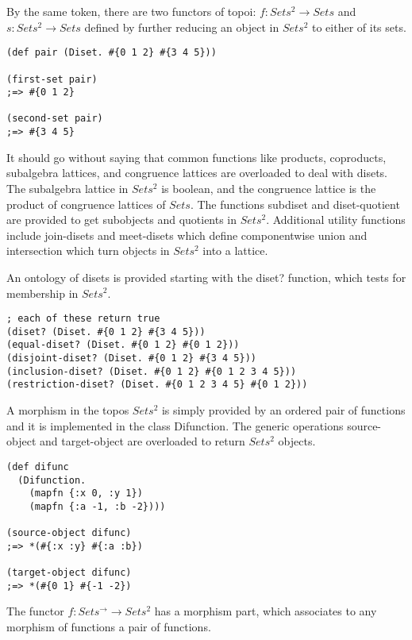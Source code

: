 \documentclass[a4paper,11pt]{report}
\begin{document}
By the same token, there are two functors of topoi: $f: Sets^2 \to Sets$ and $s: Sets^2 \to Sets$ defined by further reducing an object in $Sets^2$ to either of its sets.

\lstset {language=Lisp}
\begin{lstlisting}
(def pair (Diset. #{0 1 2} #{3 4 5}))

(first-set pair)
;=> #{0 1 2}

(second-set pair)
;=> #{3 4 5}
\end{lstlisting}

It should go without saying that common functions like products, coproducts, subalgebra lattices, and congruence lattices are overloaded to deal with disets. The subalgebra lattice in $Sets^2$ is boolean, and the congruence lattice is the product of congruence lattices of $Sets$. The functions subdiset and diset-quotient are provided to get subobjects and quotients in $Sets^2$. Additional utility functions include join-disets and meet-disets which define componentwise union and intersection which turn objects in $Sets^2$ into a lattice. 

\newpage 

An ontology of disets is provided starting with the diset? function, which tests for membership in $Sets^2$.

\lstset {language=Lisp}
\begin{lstlisting}
; each of these return true
(diset? (Diset. #{0 1 2} #{3 4 5}))
(equal-diset? (Diset. #{0 1 2} #{0 1 2}))
(disjoint-diset? (Diset. #{0 1 2} #{3 4 5}))
(inclusion-diset? (Diset. #{0 1 2} #{0 1 2 3 4 5}))
(restriction-diset? (Diset. #{0 1 2 3 4 5} #{0 1 2}))
\end{lstlisting}

A morphism in the topos $Sets^2$ is simply provided by an ordered pair of functions and it is implemented in the class Difunction. The generic operations source-object and target-object are overloaded to return $Sets^2$ objects.

\lstset {language=Lisp}
\begin{lstlisting}
(def difunc
  (Difunction.
    (mapfn {:x 0, :y 1})
    (mapfn {:a -1, :b -2})))
    
(source-object difunc)
;=> *(#{:x :y} #{:a :b})

(target-object difunc)
;=> *(#{0 1} #{-1 -2})
\end{lstlisting}

The functor $f : Sets^{\to} \to Sets^2$ has a morphism part, which associates to any morphism of functions a pair of functions.
\end{document}
